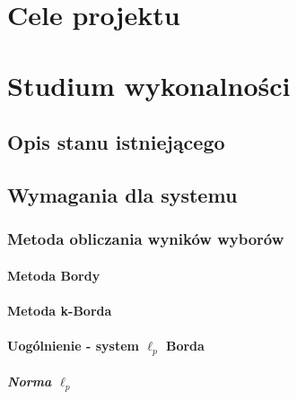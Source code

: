 \documentclass[pdflatex,11pt]{aghproc}
\author{Tomasz Kasprzyk, Daniel Ogiela, Jakub Stępak}
\date{2016}
\begin{document}
\titlepages

\tableofcontents
\clearpage

%
%
\chapter{Cele projektu}
\label{cha:cele_projektu}

\chapter{Studium wykonalności}
\label{cha:studium_wykonalnosci}

\section{Opis stanu istniejącego}
\label{sec:opis_stanu_istniejacego}

\section{Wymagania dla systemu}
\label{sec:wymagania_dla_systemu}

\subsection{Metoda obliczania wyników wyborów}
\label{subsec:metoda_obliczania_wynikow_wyborow}

\subsubsection{Metoda Bordy}
\label{subsubsec:metoda_bordy}

\subsubsection{Metoda k-Borda}
\label{subsubsec:metoda_k_borda}

\subsubsection{Uogólnienie - system $\ell_p$ Borda}
\label{subsubsec:system_ell_p_borda}

\paragraph{Norma $\ell_p$}
\label{par:norma_ell_p}
\end{document}

